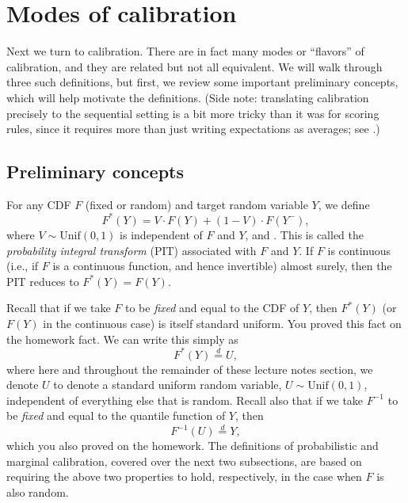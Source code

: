 \documentclass{article}
\begin{document}
\section{Modes of calibration}

Next we turn to calibration. There are in fact many modes or ``flavors'' of
calibration, and they are related but not all equivalent. We will walk through
three such definitions, but first, we review some important preliminary
concepts, which will help motivate the definitions. (Side note: translating
calibration precisely to the sequential setting is a bit more tricky than it was
for scoring rules, since it requires more than just writing expectations as 
averages; see \citet{gneiting2007probabilistic}.)        

\subsection{Preliminary concepts}

\def\deq{\overset{d}{=}}

For any CDF $F$ (fixed or random) and target random variable $Y$, we define  
\begin{equation}
\label{eq:pit}
F^*(Y) = V \cdot F(Y) + (1-V) \cdot F(Y^-),
\end{equation}
where $V \sim \mathrm{Unif}(0,1)$ is independent of $F$ and $Y$, and
. This is called the \emph{probability
  integral transform} (PIT) associated with $F$ and $Y$. If $F$ is continuous
(i.e., if $F$ is a continuous function, and hence invertible) almost surely,
then the PIT reduces to $F^*(Y) = F(Y)$.    

Recall that if we take $F$ to be \emph{fixed} and equal to the CDF of $Y$, then
$F^*(Y)$ (or $F(Y)$ in the continuous case) is itself standard uniform. You
proved this fact on the homework fact. We can write this simply as   
\[
F^*(Y) \deq U,
\]
where here and throughout the remainder of these lecture notes section, we
denote $U$ to denote a standard uniform random variable, $U \sim
\mathrm{Unif}(0,1)$, independent of everything else that is random. Recall also
that if we take $F^{-1}$ to be \emph{fixed} and equal to the quantile function
of $Y$, then  
\[
F^{-1}(U) \deq Y,
\]
which you also proved on the homework. The definitions of probabilistic and
marginal calibration, covered over the next two subsections, are based on
requiring the above two properties to hold, respectively, in the case when $F$
is also random.   
\end{document}
